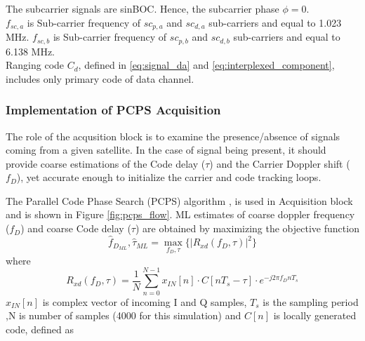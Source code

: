 \documentclass[conference]{IEEEtran}
\begin{document}
\noindent The subcarrier signals are sinBOC. Hence, the subcarrier phase $\phi=0$. \\

\noindent $f_{sc,a}$ is Sub-carrier frequency of $sc_{p,a}$ and $sc_{d,a}$ sub-carriers and equal to 1.023 MHz. 
$f_{sc,b}$ is Sub-carrier frequency of $sc_{p,b}$ and $sc_{d,b}$ sub-carriers and equal to 6.138 MHz. \\

\noindent Ranging code $C_d$, defined in \eqref{eq:signal_da} and \eqref{eq:interplexed_component}, includes only primary code of data channel. \\








\subsubsection{Implementation of PCPS Acquisition}

The role of the acqusition block is to examine the presence/absence of signals coming from a 
given satellite. In the case of signal being present, it should provide coarse estimations of the 
Code delay ($\tau$) and the Carrier Doppler shift ($f_D$), yet accurate enough to initialize the carrier and code 
tracking loops.

The Parallel Code Phase Search (PCPS) algorithm \cite{b1},\cite{b3} is used in Acquisition block 
and is shown in Figure \ref{fig:pcps_flow}. ML estimates of coarse doppler frequency ($f_D$) and coarse Code delay 
($\tau$) are obtained by maximizing the objective function
\begin{equation}
	\hat{f}_{D_{ML}}, \hat{\tau}_{ML} = \max_{f_D,\tau} \{ |R_{xd}(f_D,\tau) | ^2\}
	\label{eq:pcps}
\end{equation}
\noindent where
\begin{equation}
	R_{xd}(f_D,\tau) = \frac{1}{N} \sum_{n=0}^{N-1} x_{IN}[n] \cdot C[nT_s-\tau] \cdot e^{-j2\pi f_DnT_s}
	\label{eq:pcps2}
\end{equation}
\noindent $x_{IN}[n]$ is complex vector of incoming I and Q samples, $T_s$ is the sampling period 
,N is number of samples (4000 for this simulation) and $C[n]$ is locally generated code, defined as
\end{document}
